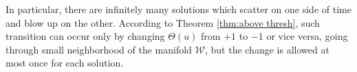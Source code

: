 \documentclass[reqno, 11pt]{amsart}
\numberwithin{equation}{section}
\theoremstyle{plain}
\theoremstyle{definition}
\numberwithin{equation}{section}
\numberwithin{theorem}{section}
\numberwithin{equation}{section}
\numberwithin{equation}{section}
\numberwithin{theorem}{section}
\begin{document}
	In particular, there are infinitely many solutions which scatter on one side of time and blow up on the other. According to Theorem \ref{thm:above thresh}, such transition can occur only by changing $\Theta(u)$ from $+1$ to $-1$ or vice versa, going through small	neighborhood of the manifold $\mathcal{W}$, but the change is allowed at most once for each solution.
	
	
\end{document}
